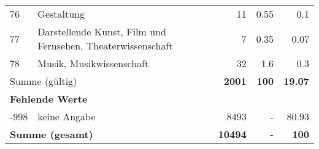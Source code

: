 \begin{longtable}{lXrrr}
        76 & \multicolumn{1}{X}{Gestaltung} & %
          \num{11} &
          \num[round-mode=places,round-precision=2]{0.55} &
          \num[round-mode=places,round-precision=2]{0.1} \\

        77 & \multicolumn{1}{X}{Darstellende Kunst, Film und Fernsehen, Theaterwissenschaft} & %
          \num{7} &
          \num[round-mode=places,round-precision=2]{0.35} &
          \num[round-mode=places,round-precision=2]{0.07} \\

        78 & \multicolumn{1}{X}{Musik, Musikwissenschaft} & %
          \num{32} &
          \num[round-mode=places,round-precision=2]{1.6} &
          \num[round-mode=places,round-precision=2]{0.3} \\

     \midrule
     \multicolumn{2}{l}{Summe (gültig)} &
       \textbf{\num{2001}} &
     \textbf{\num{100}} &
       \textbf{\num[round-mode=places,round-precision=2]{19.07}} \\
     \multicolumn{5}{l}{\textbf{Fehlende Werte}}\\
       -998 &
       keine Angabe &
         \num{8493} &
        - &
         \num[round-mode=places,round-precision=2]{80.93} \\
     \midrule
     \multicolumn{2}{l}{\textbf{Summe (gesamt)}} &
          \textbf{\num{10494}} &
        \textbf{-} &
        \textbf{\num{100}} \\
     \bottomrule
     \end{longtable}
     

